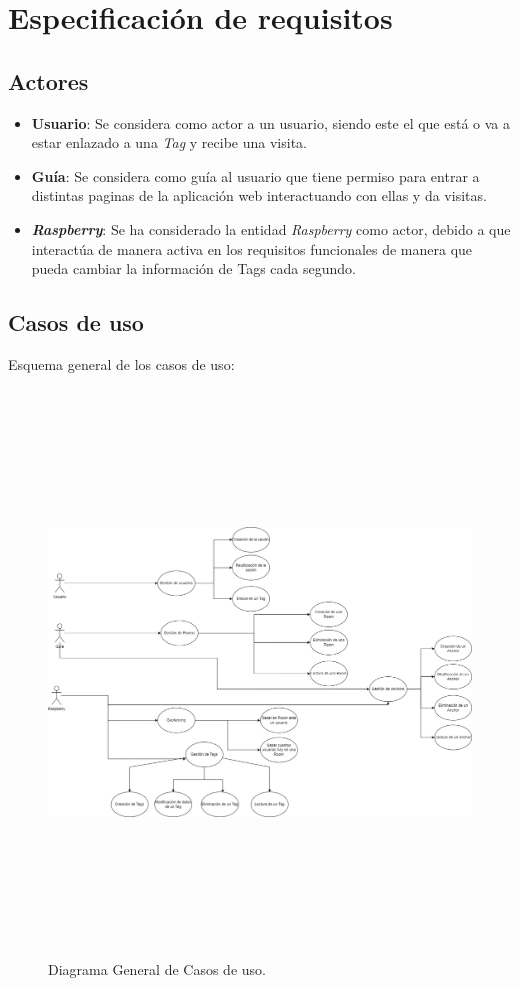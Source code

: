 \section{Especificación de requisitos}
\subsection{Actores}
\begin{itemize}
    \item \textbf{Usuario}: Se considera como actor a un usuario, siendo este el que está o va a estar enlazado a una \textit{Tag} y recibe una visita.
    \item \textbf{Guía}: Se considera como guía al usuario que tiene permiso para entrar a distintas paginas de la aplicación web interactuando con ellas y da visitas. 
    \item \textit{\textbf{Raspberry}}: Se ha considerado la entidad \textit{Raspberry} como actor, debido a que interactúa de manera activa en los requisitos funcionales de manera que pueda cambiar la información de Tags cada segundo.
\end{itemize}
\subsection{Casos de uso}

Esquema general de los casos de uso:
\FloatBarrier
\begin{figure}[h]
    \centering
    \includegraphics[width=15cm,height=15cm,keepaspectratio]{img/Diagrama General de Casos de uso.drawio (1).png}
    \caption{Diagrama General de Casos de uso.}
    \label{fig:diagrama_general_de_casos_de_uso}
\end{figure}
\FloatBarrier


